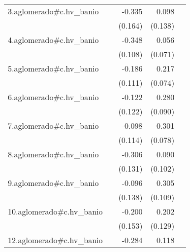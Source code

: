 {\begin{longtable}{l*{4}{D{.}{.}{-1}}}
\addlinespace
3.aglomerado#c.hv\_banio&                     &      -0.335\sym{*}  &       0.098         &                     \\
            &                     &     (0.164)         &     (0.138)         &                     \\
\addlinespace
4.aglomerado#c.hv\_banio&                     &      -0.348\sym{**} &       0.056         &                     \\
            &                     &     (0.108)         &     (0.071)         &                     \\
\addlinespace
5.aglomerado#c.hv\_banio&                     &      -0.186         &       0.217\sym{**} &                     \\
            &                     &     (0.111)         &     (0.074)         &                     \\
\addlinespace
6.aglomerado#c.hv\_banio&                     &      -0.122         &       0.280\sym{**} &                     \\
            &                     &     (0.122)         &     (0.090)         &                     \\
\addlinespace
7.aglomerado#c.hv\_banio&                     &      -0.098         &       0.301\sym{***}&                     \\
            &                     &     (0.114)         &     (0.078)         &                     \\
\addlinespace
8.aglomerado#c.hv\_banio&                     &      -0.306\sym{*}  &       0.090         &                     \\
            &                     &     (0.131)         &     (0.102)         &                     \\
\addlinespace
9.aglomerado#c.hv\_banio&                     &      -0.096         &       0.305\sym{**} &                     \\
            &                     &     (0.138)         &     (0.109)         &                     \\
\addlinespace
10.aglomerado#c.hv\_banio&                     &      -0.200         &       0.202         &                     \\
            &                     &     (0.153)         &     (0.129)         &                     \\
\addlinespace
12.aglomerado#c.hv\_banio&                     &      -0.284         &       0.118         &                     \\

\end{longtable}}
